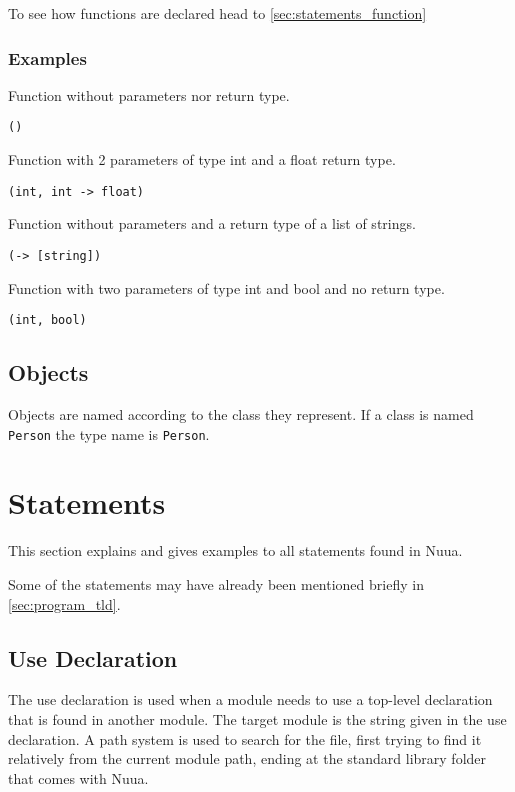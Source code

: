 To see how functions are declared head to \autoref{sec:statements_function}

\subsubsection{Examples}

Function without parameters nor return type.
\begin{lstlisting}
()
\end{lstlisting}
Function with 2 parameters of type int and a float return type.
\begin{lstlisting}
(int, int -> float)
\end{lstlisting}
Function without parameters and a return type of a list of strings.
\begin{lstlisting}
(-> [string])
\end{lstlisting}
Function with two parameters of type int and bool and no return type.
\begin{lstlisting}
(int, bool)
\end{lstlisting}

\subsection{Objects}

Objects are named according to the class they represent. If a class is named \texttt{Person} the type name is \texttt{Person}.

\section{Statements}

This section explains and gives examples to all statements found in Nuua.

Some of the statements may have already been mentioned briefly in \autoref{sec:program_tld}.

\subsection{Use Declaration}

The use declaration is used when a module needs to use a top-level declaration
that is found in another module. The target module is the string given in the use declaration. A path system is used to search for the file,
first trying to find it relatively from the current module path, ending at the standard library folder that comes with Nuua.

